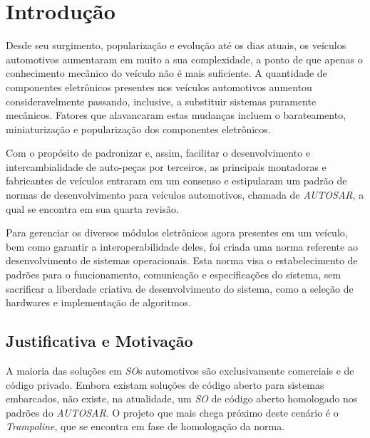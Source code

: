 \chapter{Introdução}

Desde seu surgimento, popularização e evolução até os dias atuais, os veículos automotivos aumentaram em muito a sua complexidade, a ponto de que apenas o conhecimento mecânico do veículo não é mais suficiente. A quantidade de componentes eletrônicos presentes nos veículos automotivos aumentou consideravelmente passando, inclusive, a substituir sistemas puramente mecânicos. Fatores que alavancaram estas mudanças incluem o barateamento, miniaturização e popularização dos componentes eletrônicos.

Com o propósito de padronizar e, assim, facilitar o desenvolvimento e intercambialidade de auto-peças por terceiros, as principais montadoras e fabricantes de veículos entraram em um consenso e estipularam um padrão de normas de desenvolvimento para veículos automotivos, chamada de \emph{AUTOSAR}, a qual se encontra em sua quarta revisão.

Para gerenciar os diversos módulos eletrônicos agora presentes em um veículo, bem como garantir a interoperabilidade deles, foi criada uma norma referente ao desenvolvimento de sistemas operacionais. Esta norma visa o estabelecimento de padrões para o funcionamento, comunicação e especificações do sistema, sem sacrificar a liberdade criativa de desenvolvimento do sistema, como a seleção de hardwares e implementação de algoritmos.


\section{Justificativa e Motivação}

A maioria das soluções em \emph{SO}s automotivos são exclusivamente comerciais e de código privado. Embora existam soluções de código aberto para sistemas embarcados, não existe, na atualidade, um \emph{SO} de código aberto homologado nos padrões do \emph{AUTOSAR}. O projeto que mais chega próximo deste cenário é o \emph{Trampoline}, que se encontra em fase de homologação da norma.

